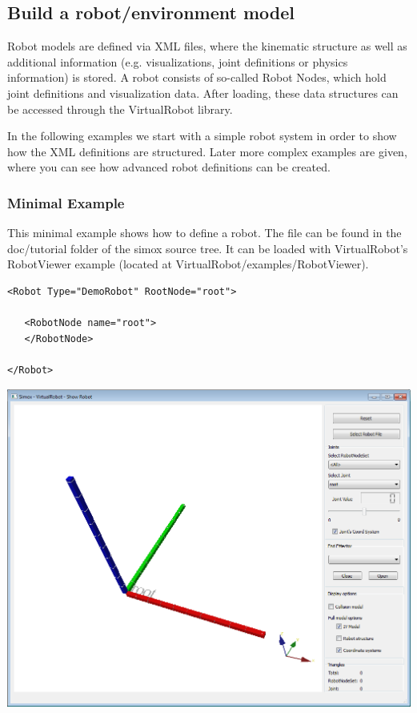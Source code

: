 \subsection{Build a robot/environment model}
Robot models are defined via XML files, where the kinematic structure as well as additional information (e.g. visualizations, joint definitions or physics information) is stored. A robot consists of so-called Robot Nodes, which hold joint definitions and visualization data. After loading, these data structures can be accessed through the VirtualRobot library.\par In the following examples we start with a simple robot system in order to show how the XML definitions are structured. Later more complex examples are given, where you can see how advanced robot definitions can be created. \par

\subsubsection{Minimal Example}
\par
This minimal example shows how to define a robot. The file can be found in the doc/tutorial folder of the simox source tree. It can be loaded with VirtualRobot's RobotViewer example (located at VirtualRobot/examples/RobotViewer). 
\par
\begin{lstlisting}
<Robot Type="DemoRobot" RootNode="root">

   <RobotNode name="root">
   </RobotNode>

</Robot>
\end{lstlisting}
\includegraphics[width=\textwidth]{Tutorial1}
\par
